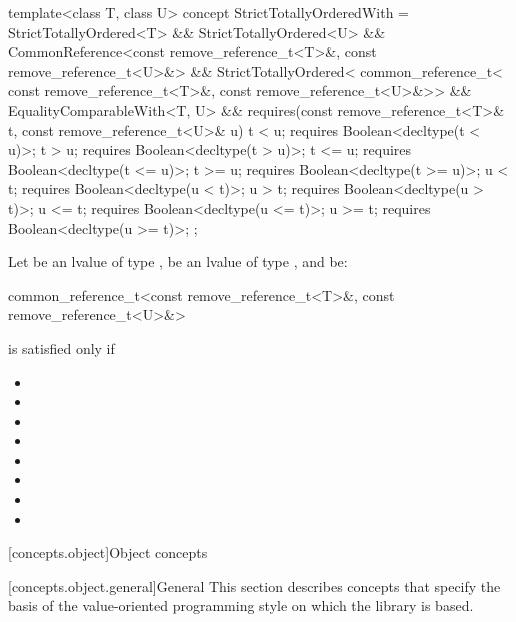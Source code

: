 \begin{itemdecl}
template<class T, class U>
  concept StrictTotallyOrderedWith =
    StrictTotallyOrdered<T> && StrictTotallyOrdered<U> &&
    CommonReference<const remove_reference_t<T>&, const remove_reference_t<U>&> &&
    StrictTotallyOrdered<
      common_reference_t<
        const remove_reference_t<T>&,
        const remove_reference_t<U>&>> &&
    EqualityComparableWith<T, U> &&
    requires(const remove_reference_t<T>& t,
             const remove_reference_t<U>& u) {
      t <  u; requires Boolean<decltype(t <  u)>;
      t >  u; requires Boolean<decltype(t >  u)>;
      t <= u; requires Boolean<decltype(t <= u)>;
      t >= u; requires Boolean<decltype(t >= u)>;
      u <  t; requires Boolean<decltype(u <  t)>;
      u >  t; requires Boolean<decltype(u >  t)>;
      u <= t; requires Boolean<decltype(u <= t)>;
      u >= t; requires Boolean<decltype(u >= t)>;
    };
\end{itemdecl}

\begin{itemdescr}
\pnum
Let  be an lvalue of type ,
 be an lvalue of type ,
and  be:
\begin{codeblock}
common_reference_t<const remove_reference_t<T>&, const remove_reference_t<U>&>
\end{codeblock}
 is satisfied only if

\begin{itemize}
\item {}
\item {}
\item {}
\item {}
\item {}
\item {}
\item {}
\item {}
\end{itemize}
\end{itemdescr}

[concepts.object]{Object concepts}

[concepts.object.general]{General}
\pnum
This section describes concepts that specify the basis of the
value-oriented programming style on which the library is based.

